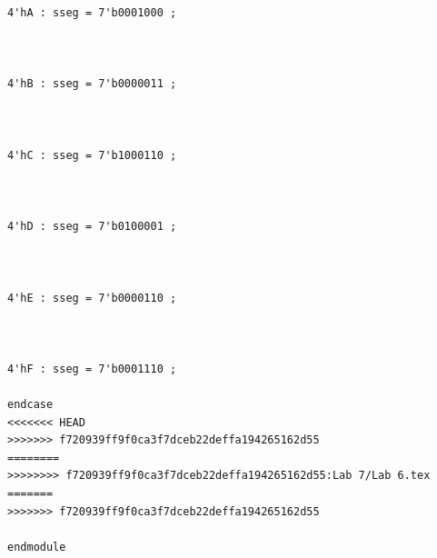 \documentclass[11pt]{article}
\begin{document}
\begin{lstlisting}[style=Verilog,caption=BCD6 Module Code,label=code:ex ]
4'hA : sseg = 7'b0001000 ;



4'hB : sseg = 7'b0000011 ;



4'hC : sseg = 7'b1000110 ;



4'hD : sseg = 7'b0100001 ;



4'hE : sseg = 7'b0000110 ;



4'hF : sseg = 7'b0001110 ;

endcase
<<<<<<< HEAD
>>>>>>> f720939ff9f0ca3f7dceb22deffa194265162d55
========
>>>>>>>> f720939ff9f0ca3f7dceb22deffa194265162d55:Lab 7/Lab 6.tex
=======
>>>>>>> f720939ff9f0ca3f7dceb22deffa194265162d55

endmodule

\end{lstlisting}
\end{document}
